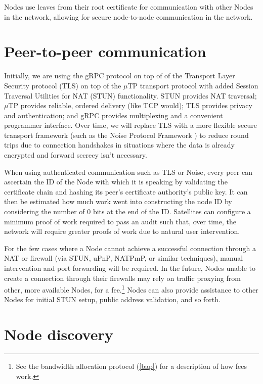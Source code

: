 \documentclass[8pt,fleqn,openany]{book}
\begin{document}
Nodes use leaves from their root certificate for communication with other
Nodes in the network, allowing for secure node-to-node communication in the network.

\section{Peer-to-peer communication}

Initially, we are using the gRPC \cite{grpc} protocol on top of of the
Transport Layer Security protocol (TLS) on top of the $\mu$TP
\cite{utp} transport protocol with added Session Traversal Utilities for NAT
(STUN) functionality. STUN provides NAT traversal; $\mu$TP provides reliable,
ordered delivery (like TCP would); TLS provides privacy and authentication;
and gRPC provides multiplexing and a convenient programmer interface.
Over time, we will replace TLS with a more flexible secure transport
framework (such as the Noise Protocol Framework \cite{noise-proto}) to
reduce round trips due to connection handshakes in situations where the data is
already encrypted and forward secrecy isn't necessary.

When using authenticated communication such as TLS or Noise, every peer can
ascertain the ID of the Node with which it is
speaking by validating the certificate chain and hashing its peer's
certificate authority's public key. It can then be estimated how much work went
into constructing the node ID by considering the number of 0 bits at the end of
the ID. Satellites can configure a minimum proof of work required to pass an
audit such that, over time, the network will require greater proofs of work
due to natural user intervention.

For the few cases where a Node cannot achieve a successful connection through a
NAT or firewall (via STUN, uPnP, NATPmP, or similar techniques), manual
intervention and port forwarding will be required. In the future, Nodes unable
to create a connection through their firewalls may rely on traffic proxying from
other, more available Nodes, for a fee.\footnote{See the bandwidth allocation
protocol (\ref{bap}) for a description of how fees work.} Nodes can also provide
assistance to other Nodes for initial STUN setup, public address validation,
and so forth.

\section{Node discovery}\label{sec:concrete-node-discovery}
\end{document}
